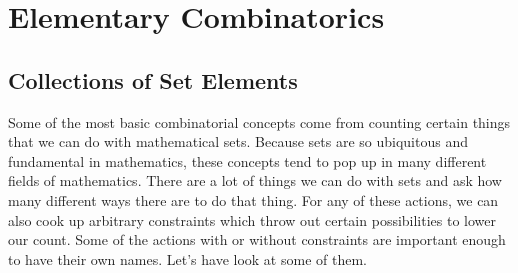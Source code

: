 \section{Elementary Combinatorics} 

\subsection{Collections of Set Elements} 
Some of the most basic combinatorial concepts come from counting certain things that we can do with mathematical sets. Because sets are so ubiquitous and fundamental in mathematics, these concepts tend to pop up in many different fields of mathematics. There are a lot of things we can do with sets and ask how many different ways there are to do that thing. For any of these actions, we can also cook up arbitrary constraints which throw out certain possibilities to lower our count. Some of the actions with or without constraints are important enough to have their own names. Let's have look at some of them.









